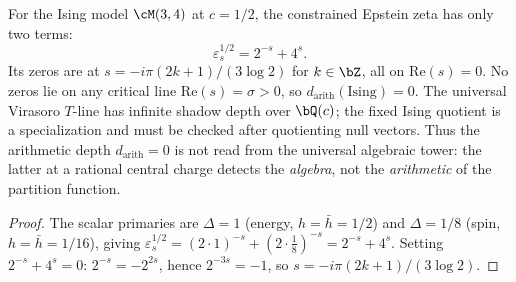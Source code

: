 \begin{proposition}[Ising model: $d_{\mathrm{arith}} = 0$]
\label{prop:ising-d-arith}
\ClaimStatusProvedHere
For the Ising model $\cM(3,4)$ at $c = 1/2$, the constrained
Epstein zeta has only two terms:
\[
 \varepsilon^{1/2}_s = 2^{-s} + 4^s.
\]
Its zeros are at $s = -i\pi(2k{+}1)/(3\log 2)$ for $k\in\bZ$, all on
$\mathrm{Re}(s) = 0$. No zeros lie on any critical line
$\mathrm{Re}(s) = \sigma > 0$, so $d_{\mathrm{arith}}
(\mathrm{Ising}) = 0$.
The universal Virasoro $T$-line has infinite shadow depth over
$\bQ(c)$; the fixed Ising quotient is a specialization and must be
checked after quotienting null vectors. Thus the arithmetic depth
$d_{\mathrm{arith}} = 0$ is not read from the universal algebraic
tower: the latter at a
rational central charge detects the \emph{algebra}, not the
\emph{arithmetic} of the partition function.
\end{proposition}

\begin{proof}
The scalar primaries are $\Delta = 1$ (energy, $h=\bar h = 1/2$)
and $\Delta = 1/8$ (spin, $h = \bar h = 1/16$), giving
$\varepsilon^{1/2}_s = (2\cdot 1)^{-s}+(2\cdot\tfrac18)^{-s}
= 2^{-s}+4^s$. Setting $2^{-s}+4^s = 0$:
$2^{-s}=-2^{2s}$, hence $2^{-3s}=-1$, so
$s = -i\pi(2k{+}1)/(3\log 2)$.
\end{proof}

